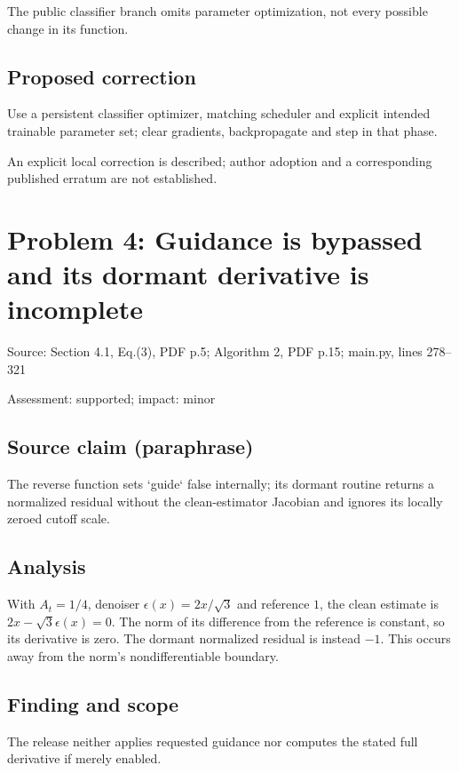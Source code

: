 \documentclass[11pt]{article}
\begin{document}
The public classifier branch omits parameter optimization, not every possible change in its function.

\subsection*{Proposed correction}

Use a persistent classifier optimizer, matching scheduler and explicit intended trainable parameter set; clear gradients, backpropagate and step in that phase.

An explicit local correction is described; author adoption and a corresponding published erratum are not established.

\section*{Problem 4: Guidance is bypassed and its dormant derivative is incomplete}

Source: Section 4.1, Eq.(3), PDF p.5; Algorithm 2, PDF p.15; main.py, lines 278–321

Assessment: supported; impact: minor

\subsection*{Source claim (paraphrase)}

The reverse function sets `guide` false internally; its dormant routine returns a normalized residual without the clean-estimator Jacobian and ignores its locally zeroed cutoff scale.

\subsection*{Analysis}

With \(A_t=1/4\), denoiser \(\epsilon(x)=2x/\sqrt3\) and reference \(1\), the clean estimate is \(2x-\sqrt3\epsilon(x)=0\). The norm of its difference from the reference is constant, so its derivative is zero. The dormant normalized residual is instead \(-1\). This occurs away from the norm’s nondifferentiable boundary.

\subsection*{Finding and scope}

The release neither applies requested guidance nor computes the stated full derivative if merely enabled.
\end{document}

